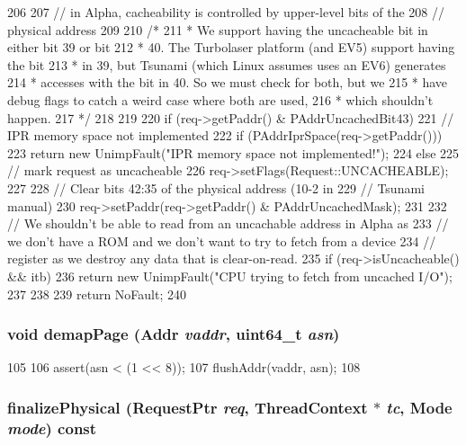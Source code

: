 \begin{DoxyCode}
206 {
207     // in Alpha, cacheability is controlled by upper-level bits of the
208     // physical address
209 
210     /*
211      * We support having the uncacheable bit in either bit 39 or bit
212      * 40.  The Turbolaser platform (and EV5) support having the bit
213      * in 39, but Tsunami (which Linux assumes uses an EV6) generates
214      * accesses with the bit in 40.  So we must check for both, but we
215      * have debug flags to catch a weird case where both are used,
216      * which shouldn't happen.
217      */
218 
219 
220     if (req->getPaddr() & PAddrUncachedBit43) {
221         // IPR memory space not implemented
222         if (PAddrIprSpace(req->getPaddr())) {
223             return new UnimpFault("IPR memory space not implemented!");
224         } else {
225             // mark request as uncacheable
226             req->setFlags(Request::UNCACHEABLE);
227 
228             // Clear bits 42:35 of the physical address (10-2 in
229             // Tsunami manual)
230             req->setPaddr(req->getPaddr() & PAddrUncachedMask);
231         }
232         // We shouldn't be able to read from an uncachable address in Alpha as
233         // we don't have a ROM and we don't want to try to fetch from a device 
234         // register as we destroy any data that is clear-on-read. 
235         if (req->isUncacheable() && itb) 
236             return new UnimpFault("CPU trying to fetch from uncached I/O");
237 
238     }
239     return NoFault;
240 }
\end{DoxyCode}
\hypertarget{classAlphaISA_1_1TLB_a2d698ff909513b48a1263f8a5440e067}{
\subsubsection[{demapPage}]{\setlength{\rightskip}{0pt plus 5cm}void demapPage ({\bf Addr} {\em vaddr}, \/  uint64\_\-t {\em asn})}}
\label{classAlphaISA_1_1TLB_a2d698ff909513b48a1263f8a5440e067}



\begin{DoxyCode}
105     {
106         assert(asn < (1 << 8));
107         flushAddr(vaddr, asn);
108     }
\end{DoxyCode}
\hypertarget{classAlphaISA_1_1TLB_ae199d95c42e036851a8a0543c6d6d2e3}{
\subsubsection[{finalizePhysical}]{ finalizePhysical ({\bf RequestPtr} {\em req}, \/  {\bf ThreadContext} $\ast$ {\em tc}, \/  {\bf Mode} {\em mode}) const}}
\label{classAlphaISA_1_1TLB_ae199d95c42e036851a8a0543c6d6d2e3}



